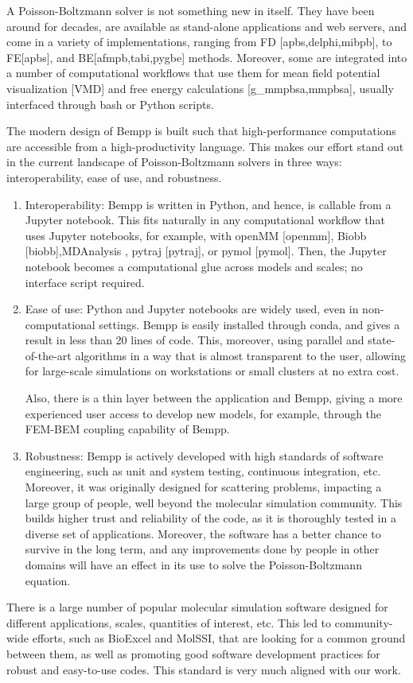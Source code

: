 A Poisson-Boltzmann solver is not something new in itself. They have been around for decades, are available as stand-alone applications and web servers, and come in a variety of implementations, ranging from FD [apbs,delphi,mibpb], to FE[apbs], and BE[afmpb,tabi,pygbe] methods. Moreover, some are integrated into a number of computational workflows that use them for mean field potential visualization [VMD] and free energy calculations [g\_mmpbsa,mmpbsa], usually interfaced through bash or Python scripts.

The modern design of Bempp is built such that high-performance computations are accessible from a high-productivity language. This makes our effort stand out in the current landscape of Poisson-Boltzmann solvers in three ways: interoperability, ease of use, and robustness. 
\begin{enumerate}
\item Interoperability: Bempp is written in Python, and hence, is callable from a Jupyter notebook. This fits naturally in any computational workflow that uses Jupyter notebooks, for example, with openMM [openmm], Biobb [biobb],MDAnalysis \cite{GowersETal2016}, pytraj [pytraj], or pymol [pymol]. Then, the Jupyter notebook becomes a computational glue across models and scales; no interface script required. 

\item Ease of use: Python and Jupyter notebooks are widely used, even in non-computational settings. Bempp is easily installed through conda, and gives a result in less than 20 lines of code. This, moreover, using parallel and state-of-the-art algorithms in a way that is almost transparent to the user, allowing for large-scale simulations on workstations or small clusters at no extra cost.

Also, there is a thin layer between the application and Bempp, giving a more experienced user access to develop new models, for example, through the FEM-BEM coupling capability of Bempp.

\item Robustness: Bempp is actively developed with high standards of software engineering, such as unit and system testing, continuous integration, etc. Moreover, it was originally designed for scattering problems, impacting a large group of people, well beyond the molecular simulation community. This builds higher trust and reliability of the code, as it is thoroughly tested in a diverse set of applications. Moreover, the software has a better chance to survive in the long term, and any improvements done by people in other domains will have an effect in its use to solve the Poisson-Boltzmann equation. 

\end{enumerate}

There is a large number of popular molecular simulation software designed for different applications, scales, quantities of interest, etc. This led to community-wide efforts, such as BioExcel and MolSSI, that are looking for a common ground between them, as well as promoting good software development practices for robust and easy-to-use codes. This standard is very much aligned with our work.

